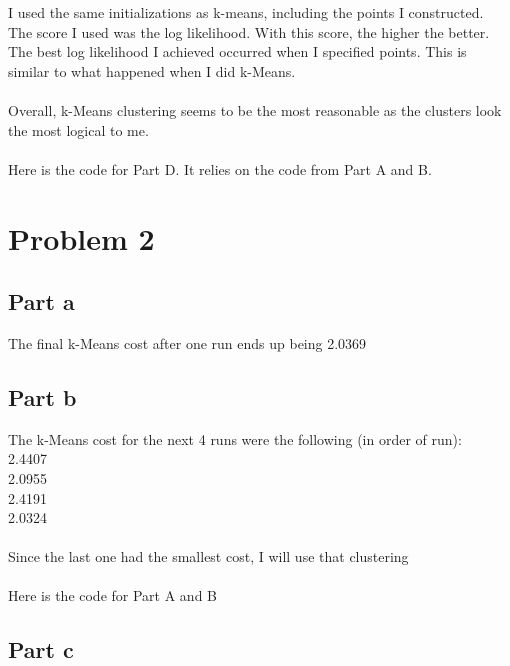 \documentclass[twoside,11pt]{article}
\theoremstyle{definition}
\begin{document}
\newpage

I used the same initializations as k-means, including the points I constructed. The score I used was the log likelihood. With this score, the higher the better. The best log likelihood I achieved occurred when I specified points. This is similar to what happened when I did k-Means. \\
\\
Overall, k-Means clustering seems to be the most reasonable as the clusters look the most logical to me. \\
\\
Here is the code for Part D. It relies on the code from Part A and B.


\newpage

\section*{Problem 2}

\subsection*{Part a}

The final k-Means cost after one run ends up being 2.0369

\subsection*{Part b}

The k-Means cost for the next 4 runs were the following (in order of run):\\
2.4407\\
2.0955\\
2.4191\\
2.0324\\
\\
Since the last one had the smallest cost, I will use that clustering\\
\\
Here is the code for Part A and B\\

\newpage

\subsection*{Part c}
\end{document}
